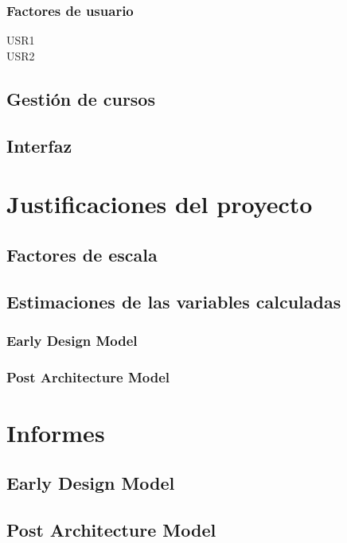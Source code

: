 \documentclass[11pt,a4paper,spanish,twoside]{book}
\begin{document}
\subsection{Factores de usuario}
\begin{description}
\item[USR1]
\item[USR2]
\end{description}


\section{Gestión de cursos}
\section{Interfaz}

\chapter{Justificaciones del proyecto}
\section{Factores de escala}
\section{Estimaciones de las variables calculadas}
\subsection{Early Design Model}
\subsection{Post Architecture Model}

\chapter{Informes}
\section{Early Design Model}
\section{Post Architecture Model}
\end{document}
